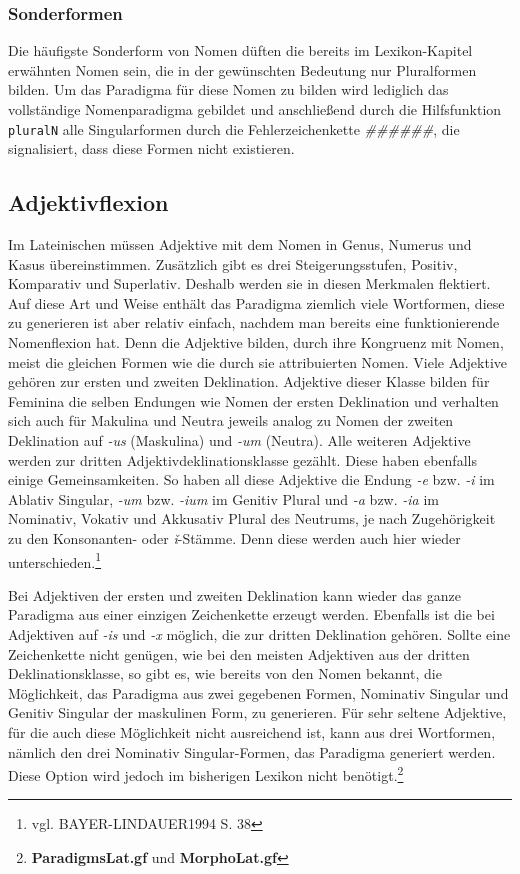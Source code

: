 \documentclass[12pt,abstract=on,titlepage,bibliography=totoc,ngerman,listof=totoc]{scrreprt}
\begin{document}
\subsubsection{Sonderformen}
Die häufigste Sonderform von Nomen düften die bereits im Lexikon-Kapitel erwähnten Nomen sein, die in der gewünschten Bedeutung nur Pluralformen bilden. Um das Paradigma für diese Nomen zu bilden wird lediglich das vollständige Nomenparadigma gebildet und anschließend durch die Hilfsfunktion \texttt{pluralN} alle Singularformen durch die Fehlerzeichenkette \textit{\#\#\#\#\#\#}, die signalisiert, dass diese Formen nicht existieren.
\subsection{Adjektivflexion}
\label{subsec:adjektiv}
Im Lateinischen müssen Adjektive mit dem Nomen in Genus, Numerus und Kasus übereinstimmen. Zusätzlich gibt es drei Steigerungsstufen, Positiv, Komparativ und Superlativ. Deshalb werden sie in diesen Merkmalen flektiert. Auf diese Art und Weise enthält das Paradigma ziemlich viele Wortformen, diese zu generieren ist aber relativ einfach, nachdem man bereits eine funktionierende Nomenflexion hat. Denn die Adjektive bilden, durch ihre Kongruenz mit Nomen, meist die gleichen Formen wie die durch sie attribuierten Nomen. Viele Adjektive gehören zur ersten und zweiten Deklination. Adjektive dieser Klasse bilden für Feminina die selben Endungen wie Nomen der ersten Deklination und verhalten sich auch für Makulina und Neutra jeweils analog zu Nomen der zweiten Deklination auf \textit{-us} (Maskulina) und \textit{-um} (Neutra). Alle weiteren Adjektive werden zur dritten Adjektivdeklinationsklasse gezählt. Diese haben ebenfalls einige Gemeinsamkeiten. So haben all diese Adjektive die Endung \textit{-e} bzw. \textit{-i} im Ablativ Singular, \textit{-um} bzw. \textit{-ium} im Genitiv Plural und \textit{-a} bzw. \textit{-ia} im Nominativ, Vokativ und Akkusativ Plural des Neutrums, je nach Zugehörigkeit zu den Konsonanten- oder \textit{ǐ}-Stämme. Denn diese werden auch hier wieder unterschieden.\footnote{vgl. BAYER-LINDAUER1994 S. 38} \par
Bei Adjektiven der ersten und zweiten Deklination kann wieder das ganze Paradigma aus einer einzigen Zeichenkette erzeugt werden. Ebenfalls ist die bei Adjektiven auf \textit{-is} und \textit{-x} möglich, die zur dritten Deklination gehören. Sollte eine Zeichenkette nicht genügen, wie bei den meisten Adjektiven aus der dritten Deklinationsklasse, so gibt es, wie bereits von den Nomen bekannt, die Möglichkeit, das Paradigma aus zwei gegebenen Formen, Nominativ Singular und Genitiv Singular der maskulinen Form, zu generieren. Für sehr seltene Adjektive, für die auch diese Möglichkeit nicht ausreichend ist, kann aus drei Wortformen, nämlich den drei Nominativ Singular-Formen, das Paradigma generiert werden. Diese Option wird jedoch im bisherigen Lexikon nicht benötigt.\footnote{\textbf{ParadigmsLat.gf} und \textbf{MorphoLat.gf}} \par
\end{document}
